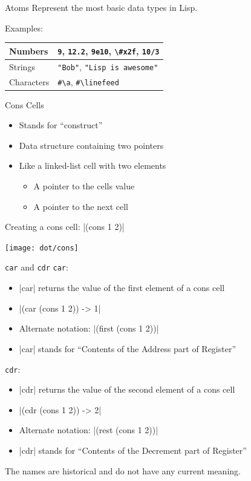 \documentclass{beamer}
\begin{document}

\begin{frame}{Atoms}
  Represent the most basic data types in Lisp.

  Examples:

  \begin{tabu}{| X | X |}
    \hline
    Numbers & \texttt{9}, \texttt{12.2}, \texttt{9e10}, \texttt{\textbackslash\#x2f}, \texttt{10/3} \\ \hline
    Strings & \texttt{"Bob"}, \texttt{"Lisp is awesome"} \\ \hline
    Characters & \texttt{\#\textbackslash{}a}, \texttt{\#\textbackslash{}linefeed} \\ \hline
  \end{tabu}
\end{frame}

\begin{frame}{Cons Cells}
  \begin{itemize}
  \item Stands for ``construct''
  \item Data structure containing two pointers
  \item Like a linked-list cell with two elements
    \begin{itemize}
    \item A pointer to the cells value
    \item A pointer to the next cell
    \end{itemize}
  \end{itemize}

  Creating a cons cell: \cl|(cons 1 2)|

  \texttt{[image: dot/cons]}
\end{frame}

\begin{frame}{\texttt{car} and \texttt{cdr}}
  \texttt{car}:
  \begin{itemize}
  \item \cl|car| returns the value of the first element of a cons cell
  \item \cl|(car (cons 1 2)) -> 1|
  \item Alternate notation: \cl|(first (cons 1 2))|
  \item \cl|car| stands for ``Contents of the Address part of Register''
  \end{itemize}
  \texttt{cdr}:
  \begin{itemize}
  \item \cl|cdr| returns the value of the second element of a cons cell
  \item \cl|(cdr (cons 1 2)) -> 2|
  \item Alternate notation: \cl|(rest (cons 1 2))|
  \item \cl|cdr| stands for ``Contents of the Decrement part of Register''
  \end{itemize}
  The names are historical and do not have any current meaning.
\end{frame}
\end{document}
